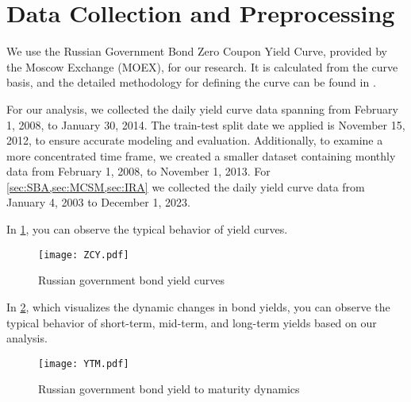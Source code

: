 \section{Data Collection and Preprocessing}
We use the Russian Government Bond Zero Coupon Yield Curve, provided by the Moscow Exchange (MOEX), for our research. It is calculated from the curve basis, and the detailed methodology for defining the curve can be found in \cite{MOEXGCURVEdocs}. 

For our analysis, we collected the daily yield curve data spanning from February 1, 2008, to January 30, 2014. The train-test split date we applied is November 15, 2012, to ensure accurate modeling and evaluation. Additionally, to examine a more concentrated time frame, we created a smaller dataset containing monthly data from February 1, 2008, to November 1, 2013.
For \cref{sec:SBA,sec:MCSM,sec:IRA} we collected the daily yield curve data from January 4, 2003 to December 1, 2023.

In \cref{fig:ZCYC}, you can observe the typical behavior of yield curves.
\begin{figure}[htbp]
    \texttt{[image: ZCY.pdf]}
    \caption{Russian government bond yield curves}
    \label{fig:ZCYC}
\end{figure}
In \cref{fig:YTMdynamics}, which visualizes the dynamic changes in bond yields, you can observe the typical behavior of short-term, mid-term, and long-term yields based on our analysis.
\begin{figure}[htbp]
    \texttt{[image: YTM.pdf]}
    \caption{Russian government bond yield to maturity dynamics}
    \label{fig:YTMdynamics}
\end{figure}
